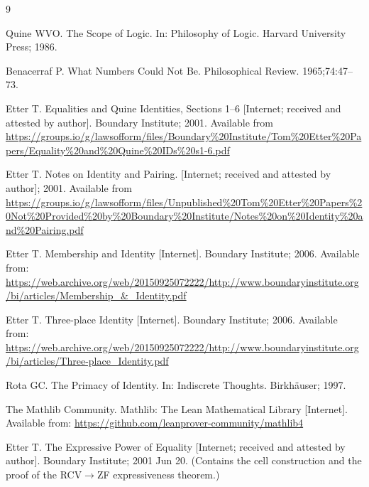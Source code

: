 \documentclass[11pt, a4paper]{article}
\theoremstyle{remark}
\begin{document}
\begin{thebibliography}{9}

Quine WVO. The Scope of Logic. In: Philosophy of Logic. Harvard University Press; 1986.

Benacerraf P. What Numbers Could Not Be. Philosophical Review. 1965;74:47–73.

    Etter T. Equalities and Quine Identities, Sections 1--6 [Internet; received and attested by author]. Boundary Institute; 2001. Available from \url{https://groups.io/g/lawsofform/files/Boundary%20Institute/Tom%20Etter%20Papers/Equality%20and%20Quine%20IDs%20s1-6.pdf}

    Etter T. Notes on Identity and Pairing. [Internet; received and attested by author]; 2001. Available from \url{https://groups.io/g/lawsofform/files/Unpublished%20Tom%20Etter%20Papers%20Not%20Provided%20by%20Boundary%20Institute/Notes%20on%20Identity%20and%20Pairing.pdf}

    Etter T. Membership and Identity [Internet]. Boundary Institute; 2006. Available from: \url{https://web.archive.org/web/20150925072222/http://www.boundaryinstitute.org/bi/articles/Membership_&_Identity.pdf}

    Etter T. Three-place Identity [Internet]. Boundary Institute; 2006. Available from: \url{https://web.archive.org/web/20150925072222/http://www.boundaryinstitute.org/bi/articles/Three-place_Identity.pdf}

Rota GC. The Primacy of Identity. In: Indiscrete Thoughts. Birkh\"auser; 1997.

    The Mathlib Community. Mathlib: The Lean Mathematical Library [Internet]. Available from: \url{https://github.com/leanprover-community/mathlib4}

    Etter T. The Expressive Power of Equality [Internet; received and attested by author]. Boundary Institute; 2001 Jun 20. (Contains the cell construction and the proof of the RCV$\to$ZF expressiveness theorem.)

\end{thebibliography}
\end{document}
